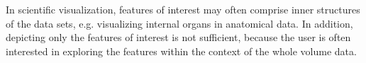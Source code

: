 
In scientific visualization, features of interest may often comprise inner structures of the data sets, e.g. visualizing internal organs in anatomical data.
In addition, depicting only the features of interest is not sufficient, because the user is often interested in exploring the features within the context of the whole volume data.


